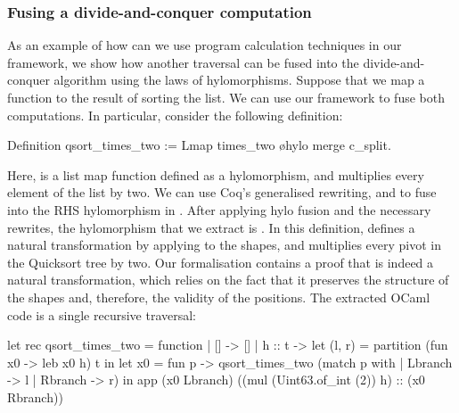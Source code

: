 \documentclass{llncs}
\begin{document}
\subsubsection{Fusing a divide-and-conquer computation}
As an example of how can we use program calculation techniques in our 
framework, we show how another traversal can be fused into the
divide-and-conquer algorithm using the laws of hylomorphisms.
Suppose that we map a function to the result of sorting the list. We can
use our framework to fuse both computations. In particular, consider
the following definition:
\begin{coqcode}
Definition qsort_times_two := Lmap times_two \o hylo merge c_split.
\end{coqcode}
Here,  is a list map function defined as a hylomorphism,
and  multiplies every element of the list by two.
We can use Coq's generalised rewriting, and  to fuse
 into the RHS hylomorphism in .
After applying hylo fusion and the necessary rewrites, the hylomorphism that we
extract is . In this definition,
 defines a natural transformation by applying  to
the shapes, and  multiplies every pivot in the Quicksort tree by
two. Our formalisation contains a proof that  is indeed a natural
transformation, which relies on the fact that it preserves the structure of the
shapes and, therefore, the validity of the positions.  The extracted OCaml code
is a single recursive traversal:
\begin{ocamlcode}
let rec qsort_times_two = function | [] -> []
| h :: t -> let (l, r) = partition (fun x0 -> leb x0 h) t in
            let x0 = fun p -> qsort_times_two (match p with
                                 | Lbranch -> l | Rbranch -> r) in
            app (x0 Lbranch) ((mul (Uint63.of_int (2)) h) :: (x0 Rbranch))
\end{ocamlcode}
\end{document}
